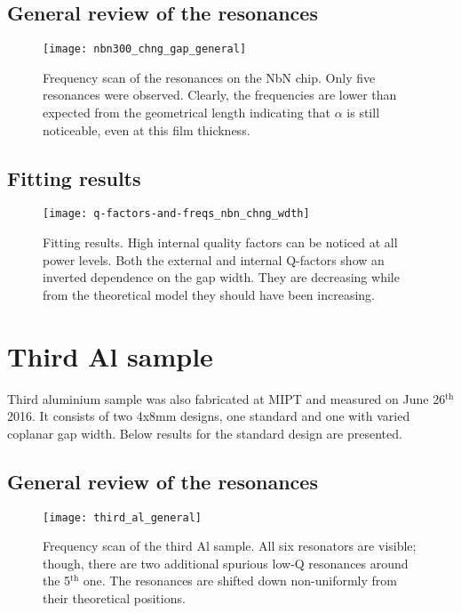 \documentclass[12pt]{article}
\numberwithin{equation}{section}
\numberwithin{figure}{section}
\begin{document}
\subsection{General review of the resonances}

\begin{figure}[h!]
\centering
\texttt{[image: nbn300\_chng\_gap\_general]}
\caption{Frequency scan of the resonances on the NbN chip. Only five resonances were observed. Clearly, the frequencies are lower than expected from the geometrical length indicating that $\alpha$ is still noticeable, even at this film thickness.}
\end{figure}

\subsection{Fitting results}

\begin{figure}[h!]
\centering
\texttt{[image: q-factors-and-freqs\_nbn\_chng\_wdth]}
\caption{Fitting results. High internal quality factors can be noticed at all power levels. Both the external and internal Q-factors show an inverted dependence on the gap width. They are decreasing while from the theoretical model they should have been increasing.}
\end{figure}

\section{Third Al sample}

Third aluminium sample was also fabricated at MIPT and measured on June 26$^\text{th}$ 2016. It consists of two 4x8mm designs, one standard and one with varied coplanar gap width. Below results for the standard design are presented.

\subsection{General review of the resonances}

\begin{figure}[h]
\centering
\texttt{[image: third\_al\_general]}
\caption{Frequency scan of the third Al sample. All six resonators are visible; though, there are two additional spurious low-Q resonances around the 5$^\text{th}$ one. The resonances are shifted down non-uniformly from their theoretical positions.}
\label{fig:third_al_general}
\end{figure}
\end{document}
